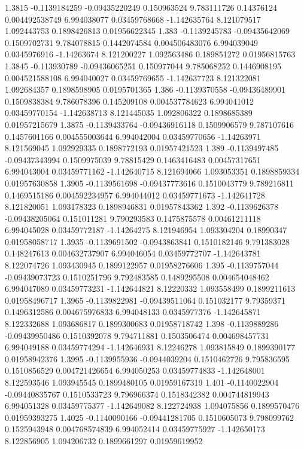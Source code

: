 {1.3815 -0.1139184259 -0.09435220249 0.150963524 9.783111726 0.14376124 0.004492538749 6.994038077 0.03459768668 -1.142635764 8.121079517 1.092443753 0.1898426813 0.01956622345
1.383 -0.1139245783 -0.09435642069 0.1509702731 9.784078815 0.1442074584 0.004506483076 6.994039049 0.0345976916 -1.14263674 8.121200227 1.092563486 0.189851272 0.01956815763
1.3845 -0.113930789 -0.09436065251 0.150977044 9.785068252 0.1446908195 0.004521588108 6.994040027 0.03459769655 -1.142637723 8.121322081 1.092684357 0.1898598905 0.0195701365
1.386 -0.1139370558 -0.09436489901 0.1509838384 9.786078396 0.145209108 0.004537784623 6.994041012 0.03459770154 -1.142638713 8.121445035 1.092806322 0.1898685389 0.01957215679
1.3875 -0.1139433764 -0.09436916118 0.1509906579 9.787107616 0.1457601166 0.004555003644 6.994042004 0.03459770656 -1.14263971 8.121569045 1.092929335 0.1898772193 0.01957421523
1.389 -0.1139497485 -0.09437343994 0.1509975039 9.78815429 0.1463416483 0.00457317651 6.994043004 0.03459771162 -1.142640715 8.121694066 1.093053351 0.1898859334 0.01957630858
1.3905 -0.1139561698 -0.09437773616 0.1510043779 9.789216811 0.1469515186 0.004592234957 6.994044012 0.03459771673 -1.142641728 8.121820051 1.093178323 0.1898946831 0.01957843362
1.392 -0.1139626378 -0.09438205064 0.151011281 9.790293583 0.1475875578 0.00461211118 6.994045028 0.03459772187 -1.14264275 8.121946954 1.093304204 0.18990347 0.01958058717
1.3935 -0.1139691502 -0.0943863841 0.1510182146 9.791383028 0.148247613 0.004632737907 6.994046054 0.03459772707 -1.142643781 8.122074726 1.093430945 0.1899122957 0.01958276606
1.395 -0.1139757044 -0.09439073723 0.1510251796 9.792483585 0.1489295508 0.004654048462 6.994047089 0.03459773231 -1.142644821 8.12220332 1.093558499 0.1899211613 0.01958496717
1.3965 -0.1139822981 -0.09439511064 0.151032177 9.79359371 0.1496312586 0.004675976833 6.994048133 0.0345977376 -1.142645871 8.122332688 1.093686817 0.1899300683 0.01958718742
1.398 -0.1139889286 -0.09439950486 0.1510392078 9.794711881 0.1503506474 0.004698457731 6.994049188 0.03459774294 -1.142646931 8.12246278 1.093815849 0.1899390177 0.01958942376
1.3995 -0.1139955936 -0.0944039204 0.1510462726 9.795836595 0.1510856529 0.004721426654 6.994050253 0.03459774833 -1.142648001 8.122593546 1.093945545 0.1899480105 0.01959167319
1.401 -0.1140022904 -0.09440835767 0.1510533723 9.796966374 0.1518342382 0.004744819943 6.994051328 0.03459775377 -1.142649082 8.122724938 1.094075856 0.1899570476 0.01959393275
1.4025 -0.1140090166 -0.09441281705 0.1510605073 9.798099762 0.1525943948 0.004768574839 6.994052414 0.03459775927 -1.142650173 8.122856905 1.094206732 0.1899661297 0.01959619952
}

